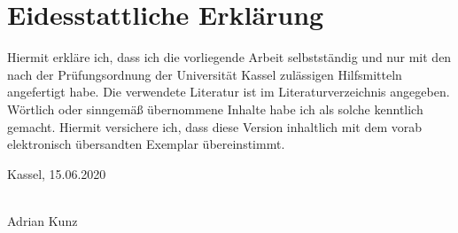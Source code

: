 \chapter*{Eidesstattliche Erklärung}


Hiermit erkläre ich, dass ich die vorliegende Arbeit selbstständig und nur mit den nach der Prüfungsordnung der Universität Kassel zulässigen Hilfsmitteln angefertigt habe.
Die verwendete Literatur ist im Literaturverzeichnis angegeben.
Wörtlich oder sinngemäß übernommene Inhalte habe ich als solche kenntlich gemacht.
Hiermit versichere ich, dass diese Version inhaltlich mit dem vorab elektronisch übersandten Exemplar übereinstimmt.

\vspace{1cm}

Kassel, 15.06.2020

\begin{flushright}
  \underline{\hspace{7cm}} \\
  Adrian Kunz
\end{flushright}
